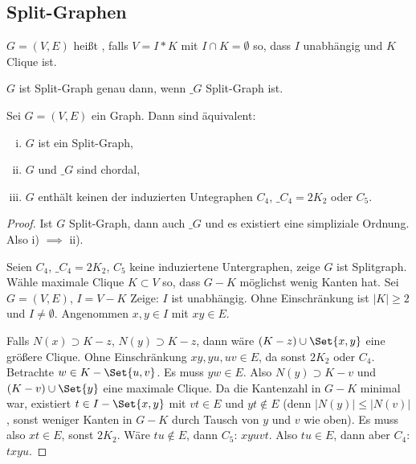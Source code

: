 \subsection{Split-Graphen}

\begin{df}
    $G = (V, E)$ heißt , falls $V = I \ast K$ mit $I \cap K = \emptyset$ so, dass $I$ unabhängig und $K$ Clique ist.
\end{df}

\begin{lem}
    $G$ ist Split-Graph genau dann, wenn $\_G$ Split-Graph ist.
\end{lem}

\begin{st}
    Sei $G = (V, E)$ ein Graph.
    Dann sind äquivalent:
    \begin{enumerate}[i)]
        \item
            $G$ ist ein Split-Graph,
        \item
            $G$ und $\_G$ sind chordal,
        \item
            $G$ enthält keinen der induzierten Untegraphen $C_4$, $\_{C_4} = 2 K_2$ oder $C_5$.
    \end{enumerate}
    \begin{proof}
        Ist $G$ Split-Graph, dann auch $\_G$ und es existiert eine simpliziale Ordnung.
        Also i) $\implies$ ii).

        Seien $C_4$, $\_{C_4} = 2 K_2$, $C_5$ keine induziertene Untergraphen, zeige $G$ ist Splitgraph.
        Wähle maximale Clique $K \subset V$ so, dass $G - K$ möglichst wenig Kanten hat.
        Sei $G = (V, E)$, $I = V - K$
        Zeige: $I$ ist unabhängig.
        Ohne Einschränkung ist $|K| \ge 2$ und $I \neq \emptyset$.
        Angenommen $x,y \in I$ mit $xy \in E$.

        Falls $N(x) \supset K - z$, $N(y) \supset K - z$, dann wäre $(K-z) \cup \Set{x,y}$ eine größere Clique.
        Ohne Einschränkung $xy, yu, uv \in E$, da sonst $2K_2$ oder $C_4$.
        Betrachte $w \in K - \Set{u,v}$.
        Es muss $yw \in E$.
        Also $N(y) \supset K - v$ und $(K-v) \cup \Set{y}$ eine maximale Clique.
        Da die Kantenzahl in $G - K$ minimal war, existiert $t \in I - \Set{x,y}$ mit $vt \in E$ und $yt \not\in E$ (denn $|N(y)| \le |N(v)|$, sonst weniger Kanten in $G - K$ durch Tausch von $y$ und $v$ wie oben).
        Es muss also $xt \in E$, sonst $2 K_2$.
        Wäre $tu \not\in E$, dann $C_5$: $xyuvt$.
        Also $tu \in E$, dann aber $C_4$: $txyu$.
    \end{proof}
\end{st}


